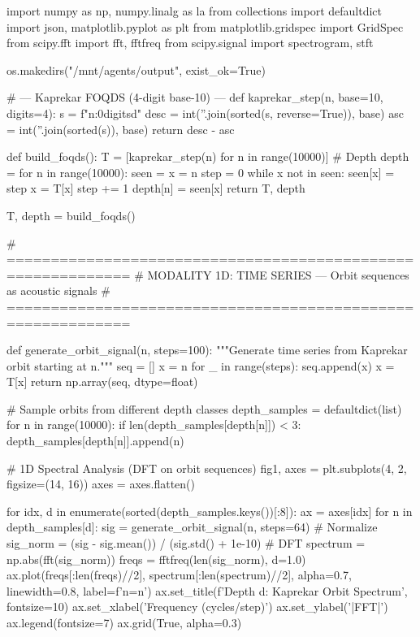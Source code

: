 {{{{{{{{{{{{{import numpy as np, numpy.linalg as la
from collections import defaultdict
import json, matplotlib.pyplot as plt
from matplotlib.gridspec import GridSpec
from scipy.fft import fft, fftfreq
from scipy.signal import spectrogram, stft

os.makedirs("/mnt/agents/output", exist_ok=True)

# --- Kaprekar FOQDS (4-digit base-10) ---
def kaprekar_step(n, base=10, digits=4):
    s = f"{n:0{digits}d}"
    desc = int(''.join(sorted(s, reverse=True)), base)
    asc = int(''.join(sorted(s)), base)
    return desc - asc

def build_foqds():
    T = [kaprekar_step(n) for n in range(10000)]
    # Depth
    depth = {}
    for n in range(10000):
        seen = {}
        x = n
        step = 0
        while x not in seen:
            seen[x] = step
            x = T[x]
            step += 1
        depth[n] = seen[x]
    return T, depth

T, depth = build_foqds()

# ============================================================
# MODALITY 1D: TIME SERIES — Orbit sequences as acoustic signals
# ============================================================

def generate_orbit_signal(n, steps=100):
    """Generate time series from Kaprekar orbit starting at n."""
    seq = []
    x = n
    for _ in range(steps):
        seq.append(x)
        x = T[x]
    return np.array(seq, dtype=float)

# Sample orbits from different depth classes
depth_samples = defaultdict(list)
for n in range(10000):
    if len(depth_samples[depth[n]]) < 3:
        depth_samples[depth[n]].append(n)

# 1D Spectral Analysis (DFT on orbit sequences)
fig1, axes = plt.subplots(4, 2, figsize=(14, 16))
axes = axes.flatten()

for idx, d in enumerate(sorted(depth_samples.keys())[:8]):
    ax = axes[idx]
    for n in depth_samples[d]:
        sig = generate_orbit_signal(n, steps=64)
        # Normalize
        sig_norm = (sig - sig.mean()) / (sig.std() + 1e-10)
        # DFT
        spectrum = np.abs(fft(sig_norm))
        freqs = fftfreq(len(sig_norm), d=1.0)
        ax.plot(freqs[:len(freqs)//2], spectrum[:len(spectrum)//2], 
                alpha=0.7, linewidth=0.8, label=f'n={n}')
    ax.set_title(f'Depth {d}: Kaprekar Orbit Spectrum', fontsize=10)
    ax.set_xlabel('Frequency (cycles/step)')
    ax.set_ylabel('|FFT|')
    ax.legend(fontsize=7)
    ax.grid(True, alpha=0.3)

}}}}}}}}}}}}}
